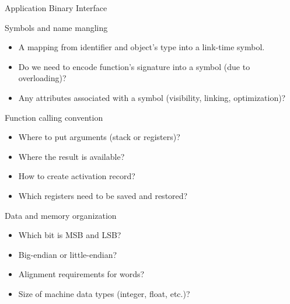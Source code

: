 \documentclass[8pt]{beamer}
\begin{document}
\begin{frame}{Application Binary Interface}
  \begin{block}{Symbols and name mangling}
    \begin{itemize}
      \item A mapping from identifier and object's type into a link-time symbol.
      \item Do we need to encode function's signature into a symbol (due to overloading)?
      \item Any attributes associated with a symbol (visibility, linking, optimization)?
    \end{itemize}
  \end{block}
    
  \begin{block}{Function calling convention}
    \begin{itemize}
      \item Where to put arguments (stack or registers)?
      \item Where the result is available?
      \item How to create activation record?
      \item Which registers need to be saved and restored?
    \end{itemize}
  \end{block}

  \begin{block}{Data and memory organization}
    \begin{itemize}
      \item Which bit is MSB and LSB?
      \item Big-endian or little-endian?
      \item Alignment requirements for words?
      \item Size of machine data types (integer, float, etc.)?
    \end{itemize}
  \end{block}
\end{frame}
\end{document}
